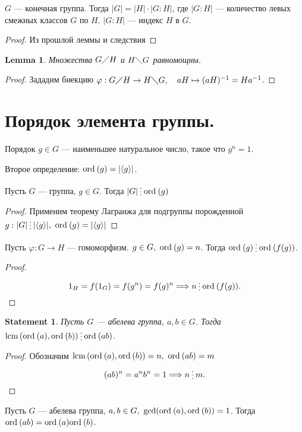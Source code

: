 \documentclass[11pt]{book}
\newcommand{\po}{\diagup}
\newcommand{\op}{\diagdown}
\newcommand{\ord}{{\mathop{\text{\rm ord}}\:}}
\newcommand{\lcm}{{\mathop{\text{\rm lcm}}\,}}
\newcommand{\del}{{\:\small \raisebox{-2pt}{\vdots}\:}}
\theoremstyle{definition}
\theoremstyle{plain}
\theoremstyle{plain}
\newtheorem{lm}{Lemma}
\newtheorem{st}{Statement}
\theoremstyle{definition}
\theoremstyle{remark}
\begin{document}
\begin{thm}[Лагранж]
    $G$ --- конечная группа. Тогда $|G| = |H|\cdot  |G:H|$, где $|G:H|$ --- количество левых смежных классов $G$ по $H$.
    $|G:H|$ --- индекс $H$ в $G$.
\end{thm}
\begin{proof}
    Из прошлой леммы и следствия
\end{proof}
\begin{lm}
    Множества $ G \po H$ и $ H \op G$ равномощны.
\end{lm}
\begin{proof}
    Зададим биекцию $ \varphi : G \po H \to  H \op G, \quad aH \mapsto (aH)^{-1} = Ha^{-1}$.
\end{proof}
\section{Порядок элемента группы.}
\begin{defn}
    {\sf Порядок} $g \in  G$ --- наименьшее натуральное число, такое что $g^n = 1$.

    Второе определение:
    $\ord(g) = | \langle g \rangle|$.
\end{defn}
\begin{thm}
    Пусть $ G$ --- группа,  $ g \in G$. Тогда $|G| \del \ord (g)$
\end{thm}
\begin{proof}
    Применим теорему Лагранжа для подгруппы порожденной $ g: |G| \del |\langle g \rangle|, ~ \ord(g) = |\langle g \rangle|$
\end{proof}
\begin{thm}
    Пусть $ \varphi : G \to H $ --- гомоморфизм. $ g \in G, ~ \ord(g) = n$. Тогда $\ord(g) \del \ord(f(g)) $.
\end{thm}
\begin{proof}
    \[
	1_H =	f(1_G) = f(g^{n}) = f(g)^{n} \Longrightarrow n \del \ord(f(g))
    .\]
\end{proof}
\begin{st}
    Пусть $ G$ --- абелева группа,  $ a, b \in G$. Тогда $\lcm (\ord (a), \ord(b)) \del  \ord(ab) $.
\end{st}
\begin{proof}
    Обозначим $\lcm (\ord (a), \ord(b)) = n, ~ \ord(ab) = m$
    \[
	(ab)^{n} = a^{n}b^{n} = 1 \Longrightarrow  n \del m
    .\]
\end{proof}
\begin{thm}\label{th_ords}
    Пусть $ G$ --- абелева группа,  $ a, b \in G, ~ \gcd(\ord (a), \ord(b)) = 1 $. Тогда $ \ord (ab) = \ord(a) \ord(b)$.
\end{thm}
\end{document}
